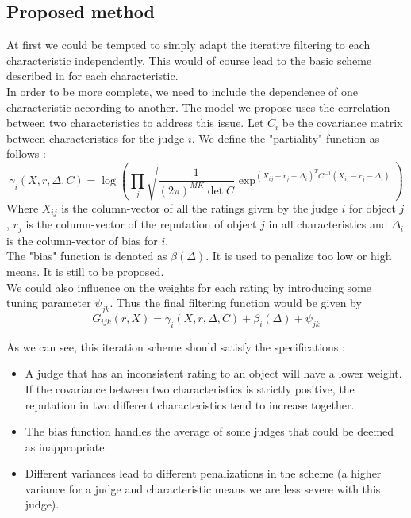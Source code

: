 \subsection*{Proposed method}
At first we could be tempted to simply adapt the iterative filtering to each characteristic independently. This would of course lead to the basic scheme described in \cite{Cristo1} for each characteristic.\\
In order to be more complete, we need to include the dependence of one characteristic according to another.
The model we propose uses the correlation between two characteristics to address this issue.
Let $C_i$ be the covariance matrix between characteristics for the judge $i$.
We define the "partiality" function as follows :
$$\gamma_{i}(X,r,\Delta,C) = \log (\prod_j \sqrt{\frac{1}{(2\pi)^{MK}\det C}} \exp^{ (X_{ij}-r_j-\Delta_i)^TC^{-1} (X_{ij}-r_j-\Delta_i)})$$
Where $X_{ij}$ is the column-vector of all the ratings given by the judge $i$ for object $j$, $r_j$ is the column-vector of the reputation of object $j$ in all characteristics and $\Delta_i$ is the column-vector of bias for $i$.\\
The "bias" function is denoted as $\beta(\Delta)$. It is used to penalize too low or high means. It is still to be proposed.\\
We could also influence on the weights for each rating by introducing some tuning parameter $\psi_{jk}$.
Thus the final filtering function would be given by 
$$G_{ijk}(r,X) = \gamma_{i}(X,r,\Delta,C) + \beta_i(\Delta)+\psi_{jk}$$

As we can see, this iteration scheme should satisfy the specifications : 
\begin{itemize}
\item A judge that has an inconsistent rating to an object will have a lower weight. If the covariance between two characteristics is strictly positive, the reputation in two different characteristics tend to increase together.
\item The bias function handles the average of some judges that could be deemed as inappropriate.
\item Different variances lead to different penalizations in the scheme (a higher variance for a judge and characteristic means we are less severe with this judge).
\end{itemize}

